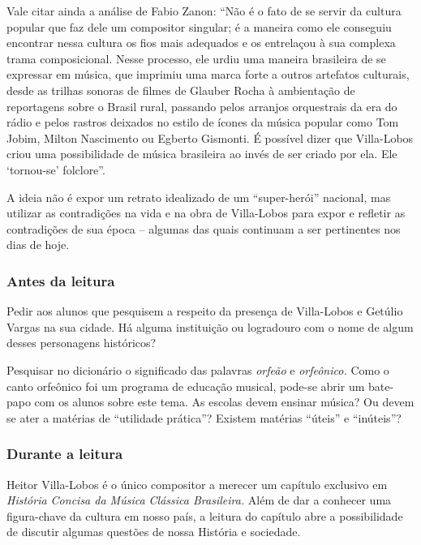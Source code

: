 \documentclass[11pt]{extarticle}
\begin{document}
Vale citar ainda a análise de Fabio Zanon: ``Não é o fato de se servir
da cultura popular que faz dele um compositor singular; é a maneira como
ele conseguiu encontrar nessa cultura os fios mais adequados e os
entrelaçou à sua complexa trama composicional. Nesse processo, ele urdiu
uma maneira brasileira de se expressar em música, que imprimiu uma marca
forte a outros artefatos culturais, desde as trilhas sonoras de filmes
de Glauber Rocha à ambientação de reportagens sobre o Brasil rural,
passando pelos arranjos orquestrais da era do rádio e pelos rastros
deixados no estilo de ícones da música popular como Tom Jobim, Milton
Nascimento ou Egberto Gismonti. É possível dizer que Villa-Lobos criou
uma possibilidade de música brasileira ao invés de ser criado por ela.
Ele `tornou-se' folclore''.

A ideia não é expor um retrato idealizado de um ``super-herói''
nacional, mas utilizar as contradições na vida e na obra de Villa-Lobos
para expor e refletir as contradições de sua época -- algumas das quais
continuam a ser pertinentes nos dias de hoje.


\subsubsection{Antes da leitura}

Pedir aos alunos que pesquisem a respeito da presença de Villa-Lobos e
Getúlio Vargas na sua cidade. Há alguma instituição ou logradouro com o
nome de algum desses personagens históricos?

Pesquisar no dicionário o significado das palavras \emph{orfeão} e
\emph{orfeônico.} Como o canto orfeônico foi um programa de educação
musical, pode-se abrir um bate-papo com os alunos sobre este tema. As
escolas devem ensinar música? Ou devem se ater a matérias de ``utilidade
prática''? Existem matérias ``úteis'' e ``inúteis''?

\subsubsection{Durante a leitura}

Heitor Villa-Lobos é o único compositor a merecer um capítulo exclusivo
em \emph{História Concisa da Música Clássica Brasileira.} Além de dar a
conhecer uma figura-chave da cultura em nosso país, a leitura do
capítulo abre a possibilidade de discutir algumas questões de nossa
História e sociedade.
\end{document}
